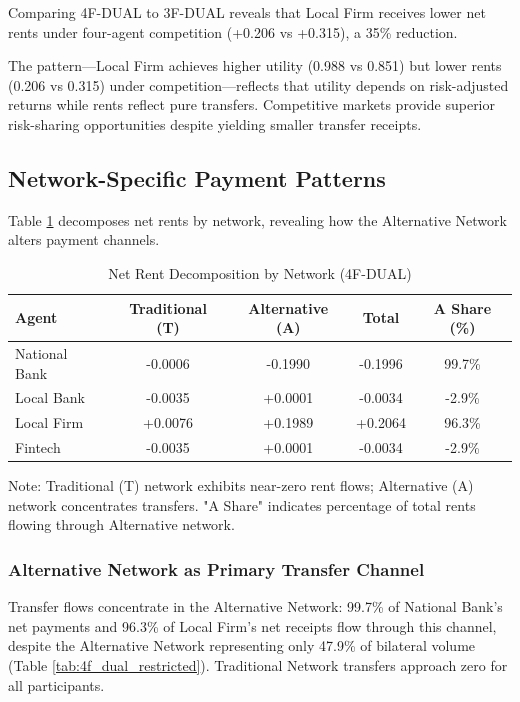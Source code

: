 Comparing 4F-DUAL to 3F-DUAL reveals that Local Firm receives lower net rents under four-agent competition (+0.206 vs +0.315), a 35\% reduction. 

The pattern—Local Firm achieves higher utility (0.988 vs 0.851) but lower rents (0.206 vs 0.315) under competition—reflects that utility depends on risk-adjusted returns while rents reflect pure transfers. Competitive markets provide superior risk-sharing opportunities despite yielding smaller transfer receipts.

\subsection{Network-Specific Payment Patterns}

Table \ref{tab:net_rents_decomposition} decomposes net rents by network, revealing how the Alternative Network alters payment channels.

\begin{table}[ht]
\centering
\caption{Net Rent Decomposition by Network (4F-DUAL)}
\label{tab:net_rents_decomposition}
\begin{tabular}{lcccc}
\toprule
\textbf{Agent} & \textbf{Traditional (T)} & \textbf{Alternative (A)} & \textbf{Total} & \textbf{A Share (\%)} \\
\midrule
National Bank  & -0.0006 & -0.1990 & -0.1996 & 99.7\% \\
Local Bank     & -0.0035 & +0.0001 & -0.0034 & -2.9\% \\
Local Firm     & +0.0076 & +0.1989 & +0.2064 & 96.3\% \\
Fintech        & -0.0035 & +0.0001 & -0.0034 & -2.9\% \\
\bottomrule
\end{tabular}
\begin{tablenotes}
\small
\item Note: Traditional (T) network exhibits near-zero rent flows; Alternative (A) network concentrates transfers. "A Share" indicates percentage of total rents flowing through Alternative network.
\end{tablenotes}
\end{table}

\subsubsection{Alternative Network as Primary Transfer Channel}

Transfer flows concentrate in the Alternative Network: 99.7\% of National Bank's net payments and 96.3\% of Local Firm's net receipts flow through this channel, despite the Alternative Network representing only 47.9\% of bilateral volume (Table \ref{tab:4f_dual_restricted}). Traditional Network transfers approach zero for all participants.

